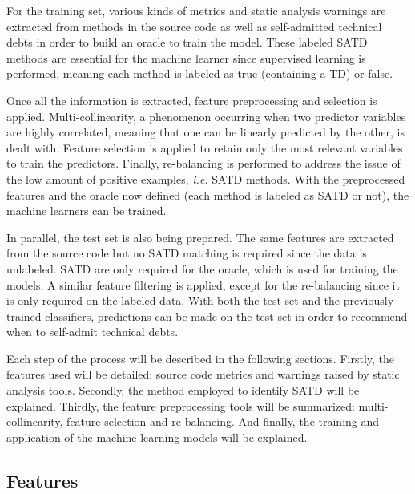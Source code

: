 For the training set, various kinds of metrics and static analysis warnings are extracted from methods in the source code as well as self-admitted technical debts in order to build an oracle to train the model. These labeled \ac{SATD} methods are essential for the machine learner since supervised learning is performed, meaning each method is labeled as true (containing a TD) or false. \par 

Once all the information is extracted, feature preprocessing and selection is applied. Multi-collinearity, a phenomenon occurring when two predictor variables are highly correlated, meaning that one can be linearly predicted by the other, is dealt with. Feature selection is applied to retain only the most relevant variables to train the predictors. Finally, re-balancing is performed to address the issue of the low amount of positive examples, \textit{i.e.} \ac{SATD} methods. With the preprocessed features and the oracle now defined (each method is labeled as \ac{SATD} or not), the machine learners can be trained. \par 

In parallel, the test set is also being prepared. The same features are extracted from the source code but no \ac{SATD} matching is required since the data is unlabeled. \ac{SATD} are only required for the oracle, which is used for training the models. A similar feature filtering is applied, except for the re-balancing since it is only required on the labeled data. With both the test set and the previously trained classifiers, predictions can be made on the test set in order to recommend when to self-admit technical debts. \par

Each step of the process will be described in the following sections. Firstly, the features used will be detailed: source code metrics and warnings raised by static analysis tools. Secondly, the method employed to identify \ac{SATD} will be explained. Thirdly, the feature preprocessing tools will be summarized: multi-collinearity, feature selection and re-balancing. And finally, the training and application of the machine learning models will be explained.

\subsection{Features}


